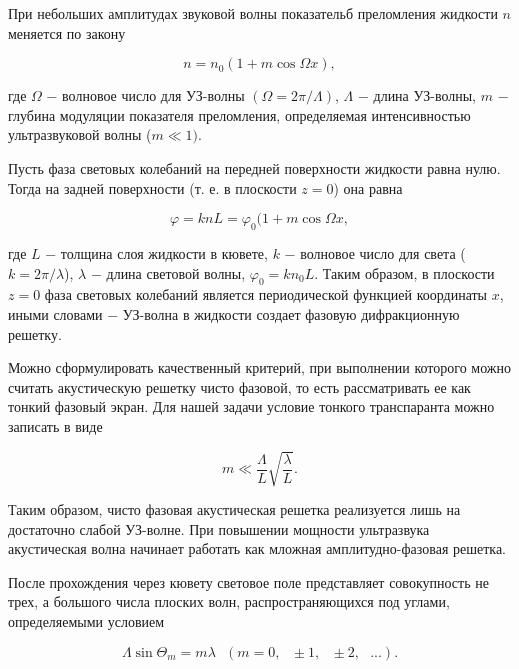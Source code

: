 \documentclass[a4paper,12pt]{article} %
\begin{document}
\hfill \break При небольших амплитудах звуковой волны показательб преломления жидкости $n$ меняется по закону

\begin{equation}\label{ linkname }
n = n_{0}(1 + m\cos{\Omega x}),
\end{equation}

\hfill \break где $\Omega$ $-$ волновое число для УЗ-волны $(\Omega = 2\pi/\Lambda)$, $\Lambda$ $-$ длина УЗ-волны, $m$ $-$ глубина модуляции показателя преломления, определяемая интенсивностью ультразвуковой волны ($m \ll 1)$.

\hfill \break Пусть фаза световых колебаний на передней поверхности жидкости равна нулю. Тогда на задней поверхности (т. е. в плоскости $z = 0$) она равна

\begin{equation}\label{ linkname }
\varphi = knL = \varphi_{0}(1 + m\cos{\Omega x},
\end{equation}

\hfill \break где $L$ $-$ толщина слоя жидкости в кювете, $k$ $-$ волновое число для света ($k = 2\pi/\lambda$), $\lambda$ $-$ длина световой волны, $\varphi_{0} = kn_{0}L$. Таким образом, в плоскости $z = 0$ фаза световых колебаний является периодической функцией координаты $x$, иными словами $-$ УЗ-волна в жидкости создает фазовую дифракционную решетку.

\hfill \break Можно сформулировать качественный критерий, при выполнении которого можно считать акустическую решетку чисто фазовой, то есть рассматривать ее как тонкий фазовый экран. Для нашей задачи условие тонкого транспаранта можно записать в виде

\begin{equation}\label{ linkname }
m \ll \frac {\Lambda} {L} \sqrt{ \frac {\lambda} {L} }.
\end{equation}

\hfill \break Таким образом, чисто фазовая акустическая решетка реализуется лишь на достаточно слабой УЗ-волне. При повышении мощности ультразвука акустическая волна начинает работать как мложная амплитудно-фазовая решетка.

\hfill \break После прохождения через кювету световое поле представляет совокупность не трех, а большого числа плоских волн, распространяющихся под углами, определяемыми условием

\begin{equation}\label{ linkname }
\Lambda \sin{\Theta_{m}} = m\lambda \text{ } (m = 0, \text{ } \pm 1, \text{ } \pm 2, \text{ } ...).
\end{equation}
\end{document}
